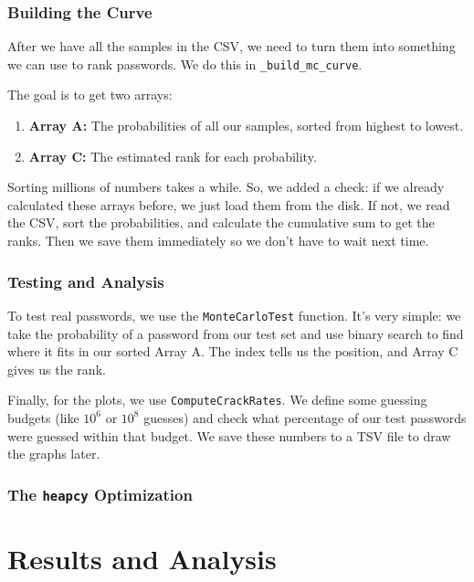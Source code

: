 \documentclass[english,noexaminfo,a4paper,oneside, binding = 0.6cm]{sapthesis}
\begin{document}
\subsection{Building the Curve}
After we have all the samples in the CSV, we need to turn them into something we can use to rank passwords. We do this in \texttt{\_build\_mc\_curve}.

The goal is to get two arrays:
\begin{enumerate}
    \item \textbf{Array A:} The probabilities of all our samples, sorted from highest to lowest.
    \item \textbf{Array C:} The estimated rank for each probability.
\end{enumerate}

Sorting millions of numbers takes a while. So, we added a check: if we already calculated these arrays before, we just load them from the disk. If not, we read the CSV, sort the probabilities, and calculate the cumulative sum to get the ranks. Then we save them immediately so we don't have to wait next time.
\subsection{Testing and Analysis}
To test real passwords, we use the \texttt{MonteCarloTest} function. It's very simple: we take the probability of a password from our test set and use binary search to find where it fits in our sorted Array A. The index tells us the position, and Array C gives us the rank.

Finally, for the plots, we use \texttt{ComputeCrackRates}. We define some guessing budgets (like $10^6$ or $10^8$ guesses) and check what percentage of our test passwords were guessed within that budget. We save these numbers to a TSV file to draw the graphs later.

\subsection{The \texttt{heapcy} Optimization}

\chapter{Results and Analysis}
\label{chap:6}
\end{document}

